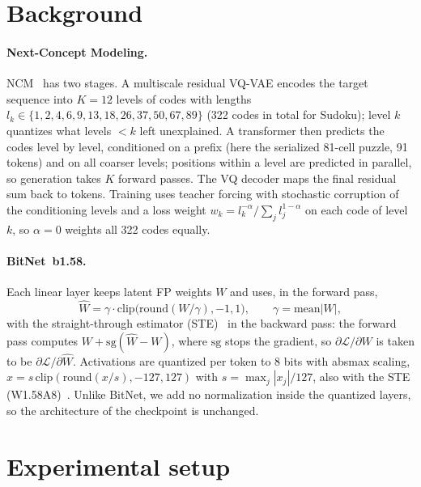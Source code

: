 \documentclass[11pt]{article}
\begin{document}
\section{Background}

\paragraph{Next-Concept Modeling.}
NCM~\citep{kumbong2026ncm} has two stages. A multiscale residual VQ-VAE encodes the target sequence into
$K=12$ levels of codes with lengths $l_k \in \{1,2,4,6,9,13,18,26,37,50,67,89\}$ (322 codes in total for
Sudoku); level $k$ quantizes what levels $<k$ left unexplained. A transformer then predicts the codes level by
level, conditioned on a prefix (here the serialized 81-cell puzzle, 91 tokens) and on all coarser levels; positions
within a level are predicted in parallel, so generation takes $K$ forward passes. The VQ decoder maps the final
residual sum back to tokens. Training uses teacher forcing with stochastic corruption of the conditioning
levels and a loss weight $w_k = l_k^{-\alpha}/\sum_j l_j^{1-\alpha}$ on each code of level $k$, so $\alpha=0$
weights all 322 codes equally.

\paragraph{BitNet~b1.58.}
Each linear layer keeps latent FP weights $W$ and uses, in the forward pass,
\begin{equation}
\widehat W = \gamma\cdot\mathrm{clip}\big(\mathrm{round}(W/\gamma),-1,1\big),\qquad \gamma=\mathrm{mean}|W|,
\end{equation}
with the straight-through estimator (STE)~\citep{bengio2013ste} in the backward pass: the forward pass computes
$W+\mathrm{sg}(\widehat W-W)$, where $\mathrm{sg}$ stops the gradient, so $\partial\mathcal L/\partial W$ is taken to
be $\partial\mathcal L/\partial\widehat W$. Activations are quantized per token to 8 bits with absmax scaling,
$\widehat x=s\,\mathrm{clip}(\mathrm{round}(x/s),-127,127)$ with $s=\max_j|x_j|/127$, also with the STE
(W1.58A8)~\citep{ma2024era}. Unlike BitNet, we add no normalization inside the quantized layers, so the
architecture of the checkpoint is unchanged.

\section{Experimental setup}
\label{sec:setup}
\end{document}
